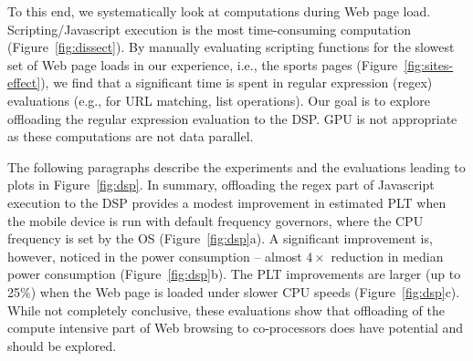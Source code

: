 




To this end, we systematically look at computations during
Web page load. Scripting/Javascript execution is the most
time-consuming computation (Figure~\ref{fig:dissect}). By manually
evaluating scripting functions
for the slowest set of Web page loads in our experience, i.e., the sports
pages (Figure~\ref{fig:sites-effect}), we find 
that a significant time is spent in regular 
expression (regex) evaluations (e.g., for 
URL matching, list operations). Our goal is to explore offloading the regular expression evaluation to the DSP. GPU is not appropriate as these computations are not data parallel.

The following paragraphs describe the experiments
and the evaluations leading to 
plots in Figure~\ref{fig:dsp}. In summary,
offloading the regex part of Javascript 
execution to the DSP provides a modest
improvement in estimated PLT when the mobile device is run with default frequency governors, where the CPU frequency is set by the OS (Figure~\ref{fig:dsp}a). 
A significant improvement is, however, noticed
in the power consumption -- almost $4\times$ reduction
in median power consumption (Figure~\ref{fig:dsp}b). The PLT improvements are larger (up to 25\%) when the Web page is loaded under slower CPU speeds (Figure~\ref{fig:dsp}c). While
not completely conclusive, these evaluations show that 
offloading of the compute intensive part of Web browsing 
to co-processors does have potential
and should be explored. 

